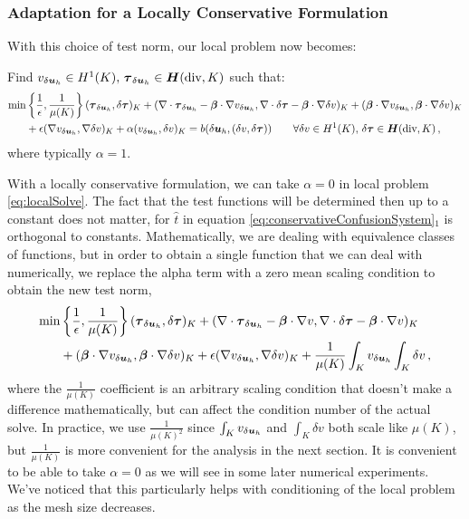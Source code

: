 \documentclass[Proposal.tex]{subfiles}
\begin{document}
\subsubsection{Adaptation for a Locally Conservative Formulation}
With this choice of test norm, our local problem now becomes:

Find $v_{\delta\boldsymbol{u}_h}\in H^{1}(K),\,\boldsymbol\tau_{\delta\boldsymbol{u}_h}\in\mbox{\boldmath $H$}(\text{div},K)$ such that:
\begin{align}
\min&\left\{\frac{1}{\epsilon},\frac{1}{\mu(K)}\right\}(\boldsymbol\tau_{\delta\boldsymbol{u}_h},\delta\boldsymbol\tau)_K
+(\nabla\cdot\boldsymbol\tau_{\delta\boldsymbol{u}_h}-\boldsymbol\beta\cdot\nabla
v_{\delta\boldsymbol{u}_h},\nabla\cdot\delta\boldsymbol\tau-\boldsymbol\beta\cdot\nabla\delta v)_K
+(\boldsymbol\beta\cdot\nabla v_{\delta\boldsymbol{u}_h},\boldsymbol\beta\cdot\nabla \delta v)_K\nonumber\\
&+\epsilon(\nabla v_{\delta\boldsymbol{u}_h},\nabla \delta v)_K
+\alpha(v_{\delta\boldsymbol{u}_h},\delta v)_K
=b(\delta\boldsymbol{u}_h,(\delta v,\delta\boldsymbol\tau))
\quad\quad\forall\delta v\in H^{1}(K),\,\delta\boldsymbol\tau\in\mbox{\boldmath $H$}(\text{div},K)\,,
\label{eq:localSolve}
\end{align}
where typically $\alpha=1$.

With a locally conservative formulation, we can take $\alpha=0$ in local problem \eqref{eq:localSolve}. 
The fact that the test functions will be determined then up to a constant does not matter, for
$\hat t$ in equation \eqref{eq:conservativeConfusionSystem}$_1$ is orthogonal to constants.
Mathematically, we are dealing with equivalence classes of functions, but in
order to obtain a single function that we can deal with numerically, we
replace the alpha term with a zero mean scaling condition to obtain the new
test norm,
\begin{align}
\label{eq:localSolveMod}
\min&\left\{\frac{1}{\epsilon},\frac{1}{\mu(K)}\right\}(\boldsymbol\tau_{\delta\boldsymbol{u}_h},\delta\boldsymbol\tau)_K
+(\nabla\cdot\boldsymbol\tau_{\delta\boldsymbol{u}_h}-\boldsymbol\beta\cdot\nabla
v,\nabla\cdot\delta\boldsymbol\tau-\boldsymbol\beta\cdot\nabla v)_K\\
&+(\boldsymbol\beta\cdot\nabla v_{\delta\boldsymbol{u}_h},\boldsymbol\beta\cdot\nabla \delta v)_K\nonumber
+\epsilon(\nabla v_{\delta\boldsymbol{u}_h},\nabla \delta v)_K
+\frac{1}{\mu(K)}\int_Kv_{\delta\boldsymbol{u}_h}\int_K\delta v\,,
\end{align}
where the $\frac{1}{\mu(K)}$ coefficient is an arbitrary scaling condition
that doesn't make a difference mathematically, but can affect the condition
number of the actual solve. In practice, we use $\frac{1}{\mu(K)^2}$
since $\int_Kv_{\delta\boldsymbol{u}_h}$ and $\int_K\delta v$ both scale like
$\mu(K)$, but $\frac{1}{\mu(K)}$ is more convenient for the analysis in the
next section.
It is convenient to be able to take $\alpha=0$ as we will see in
some later numerical experiments.
We've noticed that this particularly helps with conditioning of the local problem as the mesh size decreases.
\end{document}
